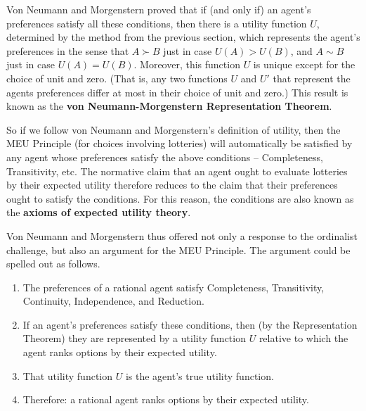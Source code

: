 Von Neumann and Morgenstern proved that if (and only if) an agent's
preferences satisfy all these conditions, then there is a utility
function $U$, determined by the method from the previous section,
which represents the agent's preferences in the sense that $A \succ B$
just in case $U(A) > U(B)$, and $A \sim B$ just in case $U(A) =
U(B)$. Moreover, this function $U$ is unique except for the choice of
unit and zero. (That is, any two functions $U$ and $U'$ that represent
the agents preferences differ at most in their choice of unit and
zero.) This result is known as the \textbf{von Neumann-Morgenstern
  Representation Theorem}.


So if we follow von Neumann and Morgenstern's definition of utility,
then the MEU Principle (for choices involving lotteries) will
automatically be satisfied by any agent whose preferences satisfy the
above conditions -- Completeness, Transitivity, etc. The normative
claim that an agent ought to evaluate lotteries by their expected
utility therefore reduces to the claim that their preferences ought to
satisfy the conditions. For this reason, the conditions are also known
as the \textbf{axioms of expected utility theory}.

Von Neumann and Morgenstern thus offered not only a response to the
ordinalist challenge, but also an argument for the MEU Principle. The
argument could be spelled out as follows.

\begin{enumerate}
  \itemsep0em
\item The preferences of a rational agent satisfy Completeness,
  Transitivity, Continuity, Independence, and Reduction.
\item If an agent's preferences satisfy these conditions, then (by the
  Representation Theorem) they are represented by a utility function
  $U$ relative to which the agent ranks options by their expected utility.
\item That utility function $U$ is the agent's true utility function.
\item Therefore: a rational agent ranks options by their expected utility.
\end{enumerate}

